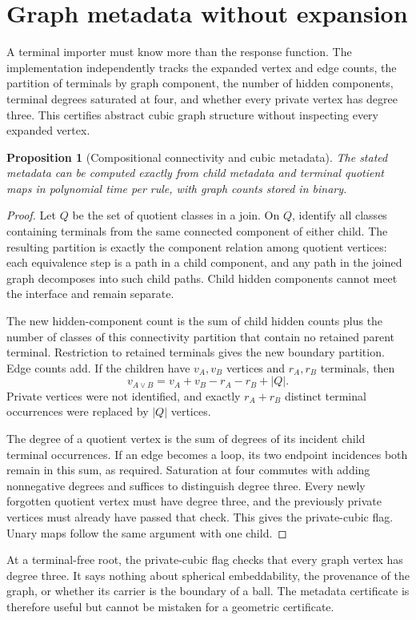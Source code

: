 \documentclass[11pt,a4paper]{article}
\newtheorem{proposition}[theorem]{Proposition}
\theoremstyle{definition}
\theoremstyle{remark}
\begin{document}
\section{Graph metadata without expansion}
\label{sec:metadata}
A terminal importer must know more than the response function. The implementation independently tracks the expanded vertex and edge counts, the partition of terminals by graph component, the number of hidden components, terminal degrees saturated at four, and whether every private vertex has degree three. This certifies abstract cubic graph structure without inspecting every expanded vertex.

\begin{proposition}[Compositional connectivity and cubic metadata]
\label{prop:metadata}
The stated metadata can be computed exactly from child metadata and terminal quotient maps in polynomial time per rule, with graph counts stored in binary.
\end{proposition}
\begin{proof}
Let $Q$ be the set of quotient classes in a join. On $Q$, identify all classes containing terminals from the same connected component of either child. The resulting partition is exactly the component relation among quotient vertices: each equivalence step is a path in a child component, and any path in the joined graph decomposes into such child paths. Child hidden components cannot meet the interface and remain separate.

The new hidden-component count is the sum of child hidden counts plus the number of classes of this connectivity partition that contain no retained parent terminal. Restriction to retained terminals gives the new boundary partition. Edge counts add. If the children have $v_A,v_B$ vertices and $r_A,r_B$ terminals, then
\[
 v_{A\vee B}=v_A+v_B-r_A-r_B+|Q|.
\]
Private vertices were not identified, and exactly $r_A+r_B$ distinct terminal occurrences were replaced by $|Q|$ vertices.

The degree of a quotient vertex is the sum of degrees of its incident child terminal occurrences. If an edge becomes a loop, its two endpoint incidences both remain in this sum, as required. Saturation at four commutes with adding nonnegative degrees and suffices to distinguish degree three. Every newly forgotten quotient vertex must have degree three, and the previously private vertices must already have passed that check. This gives the private-cubic flag. Unary maps follow the same argument with one child.
\end{proof}
At a terminal-free root, the private-cubic flag checks that every graph vertex has degree three. It says nothing about spherical embeddability, the provenance of the graph, or whether its carrier is the boundary of a ball. The metadata certificate is therefore useful but cannot be mistaken for a geometric certificate.
\end{document}
